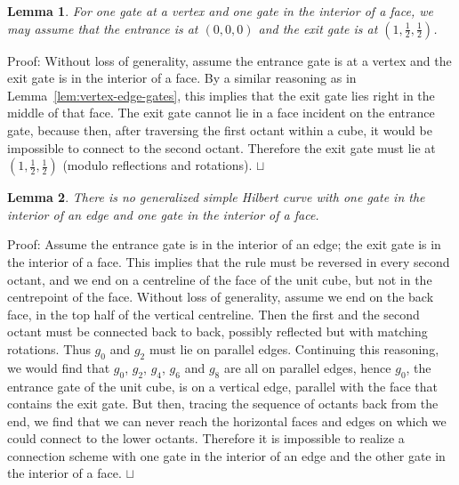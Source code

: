 \documentclass[11pt,a4paper]{article}
\newtheorem{lemma}{Lemma}
\newenvironment{proof}{Proof:}{\qed}
\def\squareforqed{\hbox{\rlap{$\sqcap$}$\sqcup$}}
\def\qed{\ifmmode\squareforqed\else{\unskip\nobreak\hfil
\penalty50\hskip1em\null\nobreak\hfil\squareforqed
\parfillskip=0pt\finalhyphendemerits=0\endgraf}\fi}
\begin{document}
\begin{lemma}\label{lem:vertex-face-gates}
For one gate at a vertex and one gate in the interior of a face, we may assume that the entrance is at $(0,0,0)$ and the exit gate is at $(1,\frac12,\frac12)$.
\end{lemma}
\begin{proof}
Without loss of generality, assume the entrance gate is at a vertex and the exit gate is in the interior of a face. By a similar reasoning as in Lemma~\ref{lem:vertex-edge-gates}, this implies that the exit gate lies right in the middle of that face. The exit gate cannot lie in a face incident on the entrance gate, because then, after traversing the first octant within a cube, it would be impossible to connect to the second octant. Therefore the exit gate must lie at $(1,\frac12,\frac12)$ (modulo reflections and rotations).
\end{proof}

\begin{lemma}\label{lem:edge-face-gates}
There is no generalized simple Hilbert curve with one gate in the interior of an edge and one gate in the interior of a face.
\end{lemma}
\begin{proof}
Assume the entrance gate is in the interior of an edge; the exit gate is in the interior of a face. This implies that the rule must be reversed in every second octant, and we end on a centreline of the face of the unit cube, but not in the centrepoint of the face. Without loss of generality, assume we end on the back face, in the top half of the vertical centreline. Then the first and the second octant must be connected back to back, possibly reflected but with matching rotations. Thus $g_0$ and $g_2$ must lie on parallel edges. Continuing this reasoning, we would find that $g_0$, $g_2$, $g_4$, $g_6$ and $g_8$ are all on parallel edges, hence $g_0$, the entrance gate of the unit cube, is on a vertical edge, parallel with the face that contains the exit gate. But then, tracing the sequence of octants back from the end, we find that we can never reach the horizontal faces and edges on which we could connect to the lower octants. Therefore it is impossible to realize a connection scheme with one gate in the interior of an edge and the other gate in the interior of a face.
\end{proof}
\end{document}
